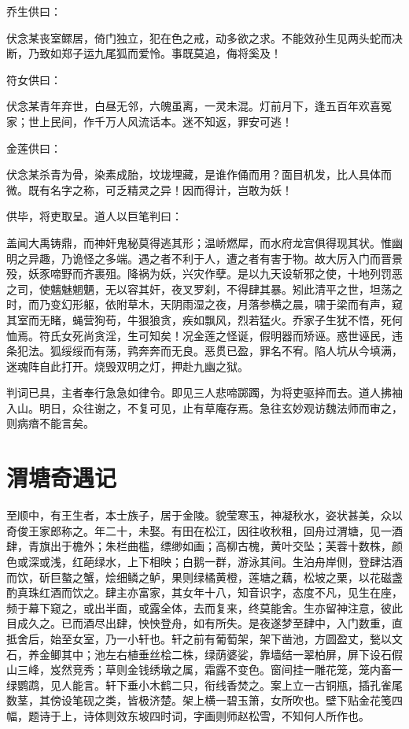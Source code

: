 \documentclass[a4paper,12pt,UTF8,twoside]{ctexbook}
\begin{document}
乔生供曰：

伏念某丧室鳏居，倚门独立，犯在色之戒，动多欲之求。不能效孙生见两头蛇而决断，乃致如郑子运九尾狐而爱怜。事既莫追，侮将奚及！

符女供曰：

伏念某青年弃世，白昼无邻，六魄虽离，一灵未混。灯前月下，逢五百年欢喜冤家；世上民间，作千万人风流话本。迷不知返，罪安可逃！

金莲供曰：

伏念某杀青为骨，染素成胎，坟垅埋藏，是谁作俑而用？面目机发，比人具体而微。既有名字之称，可乏精灵之异！因而得计，岂敢为妖！

供毕，将吏取呈。道人以巨笔判曰：

盖闻大禹铸鼎，而神奸鬼秘莫得逃其形；温峤燃犀，而水府龙宫俱得现其状。惟幽明之异趣，乃诡怪之多端。遇之者不利于人，遭之者有害于物。故大厉入门而晋景殁，妖豕啼野而齐裹殂。降祸为妖，兴灾作孽。是以九天设斩邪之使，十地列罚恶之司，使魑魅魍魉，无以容其奸，夜叉罗刹，不得肆其暴。矧此清平之世，坦荡之时，而乃变幻形躯，依附草木，天阴雨湿之夜，月落参横之晨，啸于梁而有声，窥其室而无睹，蝇营狗苟，牛狠狼贪，疾如飘风，烈若猛火。乔家子生犹不悟，死何恤焉。符氏女死尚贪淫，生可知矣！况金莲之怪诞，假明器而矫诬。惑世诬民，违条犯法。狐绥绥而有荡，鹑奔奔而无良。恶贯已盈，罪名不宥。陷人坑从今填满，迷魂阵自此打开。烧毁双明之灯，押赴九幽之狱。

判词已具，主者奉行急急如律令。即见三人悲啼踯躅，为将吏驱捽而去。道人拂袖入山。明日，众往谢之，不复可见，止有草庵存焉。急往玄妙观访魏法师而审之，则病瘖不能言矣。

\chapter{渭塘奇遇记}

至顺中，有王生者，本士族子，居于金陵。貌莹寒玉，神凝秋水，姿状甚美，众以奇俊王家郎称之。年二十，未娶。有田在松江，因往收秋租，回舟过渭塘，见一酒肆，青旗出于檐外；朱栏曲槛，缥缈如画；高柳古槐，黄叶交坠；芙蓉十数株，颜色或深或浅，红葩绿水，上下相映；白鹅一群，游泳其间。生泊舟岸侧，登肆沽酒而饮，斫巨螯之蟹，烩细鳞之鲈，果则绿橘黄橙，莲塘之藕，松坡之栗，以花磁盏酌真珠红酒而饮之。肆主亦富家，其女年十八，知音识字，态度不凡，见生在座，频于幕下窥之，或出半面，或露全体，去而复来，终莫能舍。生亦留神注意，彼此目成久之。已而酒尽出肆，怏怏登舟，如有所失。是夜遂梦至肆中，入门数重，直抵舍后，始至女室，乃一小轩也。轩之前有葡萄架，架下凿池，方圆盈丈，甃以文石，养金鲫其中；池左右植垂丝桧二株，绿荫婆娑，靠墙结一翠柏屏，屏下设石假山三峰，岌然竞秀；草则金钱绣墩之属，霜露不变色。窗间挂一雕花笼，笼内畜一绿鹦鹉，见人能言。轩下垂小木鹤二只，衔线香焚之。案上立一古铜瓶，插孔雀尾数茎，其傍设笔砚之类，皆极济楚。架上横一碧玉箫，女所吹也。壁下贴金花笺四幅，题诗于上，诗体则效东坡四时词，字画则师赵松雪，不知何人所作也。
\end{document}

